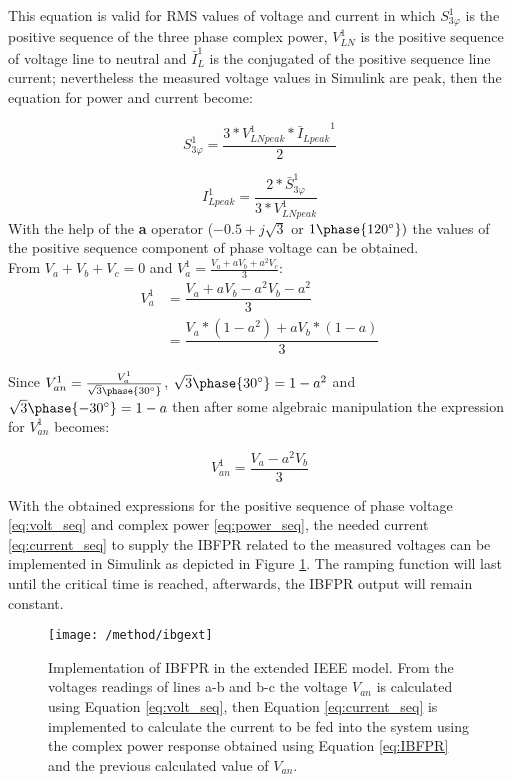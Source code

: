 This equation is valid for RMS values of voltage and current in which $ S_{3\varphi}^1 $ is the positive sequence of the three phase complex power, $ V_{LN}^1 $ is the positive sequence of voltage line to neutral and $ \bar I_{L}^1 $ is the conjugated of the positive sequence line current; nevertheless the measured voltage values in Simulink are peak, then the equation for power and current become:

\begin{equation}
\label{eq:power_seq}
S_{3\varphi}^1=\dfrac{3*V_{LNpeak}^1*{\bar I_{Lpeak}}^1}{2}
\end{equation}


\begin{equation}
\label{eq:current_seq}
I_{Lpeak}^1=\dfrac{2*\bar{S}_{3\varphi}^1}{3*V_{LNpeak}^1}
\end{equation}
With the help of the \textbf{a} operator ($-0.5+j\sqrt{3}$ or $ 1\phase{120^{\circ}}) $ the values of the positive sequence component of phase voltage can be obtained. \\
From $ V_a +V_b+V_c=0$ and $ V_a^1=\frac{V_a+ aV_b+a^2 V_c}{3} $:
\begin{align*}
	 V_a^1 & =\dfrac{V_a+ aV_b-a^2 V_b-a^2}{3} \\
	& =\dfrac{V_a*(1-a^2)+ aV_b*(1-a)}{3}
\end{align*}

Since $V_{an}^1=\frac{V_a^1}{\sqrt{3}\phase{30^{\circ}}}$, $\sqrt{3}\phase{30^{\circ}}=1-a^2 $ and $ \sqrt{3}\phase{-30^{\circ}}=1-a $ then after some algebraic manipulation the expression for $ V_{an}^1 $ becomes:

\begin{equation}
	\label{eq:volt_seq}
	V_{an}^1=\dfrac{V_a-a^2 V_b}{3}
\end{equation}

With the obtained expressions  for the positive sequence of phase voltage \eqref{eq:volt_seq} and complex power \eqref{eq:power_seq}, the needed current \eqref{eq:current_seq} to supply the IBFPR related to the measured voltages can be implemented in Simulink as depicted in Figure \ref{fig:ieeeext_ibfpr}. The ramping function will last until the critical time is reached, afterwards, the IBFPR output will remain constant.

\begin{figure}[h]
	\centering
	\texttt{[image: /method/ibgext]}
	\caption{Implementation of IBFPR in the extended IEEE model. From the voltages readings of lines a-b and b-c the voltage $ V_{an} $ is calculated using Equation \eqref{eq:volt_seq}, then Equation \eqref{eq:current_seq} is implemented to calculate the current to be fed into the system using the complex power response obtained using Equation \eqref{eq:IBFPR} and the previous calculated value of $ V_{an} $.} 
	\label{fig:ieeeext_ibfpr}
\end{figure}

